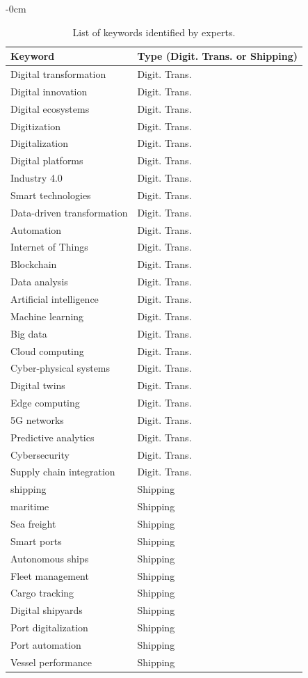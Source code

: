 \documentclass[jmse,review,submit,pdftex,moreauthors]{Definitions/mdpi}
\begin{document}
\begin{adjustwidth}{-\extralength}{0cm}
\begin{table}[H]
	\centering
	\caption{List of keywords identified by experts.}
	\begin{tabularx}{\linewidth}{XX}
		\hline
		Keyword& Type (Digit. Trans. or Shipping) \\
		\hline
		Digital transformation & Digit. Trans. \\
		Digital innovation & Digit. Trans. \\
		Digital ecosystems & Digit. Trans. \\
		Digitization & Digit. Trans. \\
		Digitalization & Digit. Trans. \\
		Digital platforms & Digit. Trans. \\
		Industry 4.0 & Digit. Trans. \\
		Smart technologies & Digit. Trans. \\
		Data-driven transformation & Digit. Trans. \\
		Automation & Digit. Trans. \\
		Internet of Things & Digit. Trans. \\
		Blockchain & Digit. Trans. \\
		Data analysis & Digit. Trans. \\
		Artificial intelligence & Digit. Trans. \\
		Machine learning & Digit. Trans. \\
		Big data & Digit. Trans. \\
		Cloud computing & Digit. Trans. \\
		Cyber-physical systems & Digit. Trans. \\
		Digital twins & Digit. Trans. \\
		Edge computing & Digit. Trans. \\
		5G networks & Digit. Trans. \\
		Predictive analytics & Digit. Trans. \\
		Cybersecurity & Digit. Trans. \\
		Supply chain integration & Digit. Trans. \\
		shipping & Shipping \\
		maritime & Shipping \\
		Sea freight & Shipping \\
		Smart ports & Shipping \\
		Autonomous ships & Shipping \\
		Fleet management & Shipping \\
		Cargo tracking & Shipping \\
		Digital shipyards & Shipping \\
		Port digitalization & Shipping \\
		Port automation & Shipping \\
		Vessel performance & Shipping \\
		\hline
	\end{tabularx}
	\label{tab:keywords}
\end{table}


\end{adjustwidth}
\end{document}
